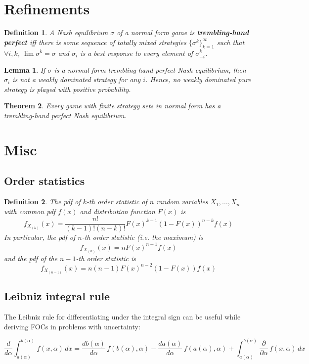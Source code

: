 \documentclass[letter, 10pt]{article}
\newtheorem{definition}{Definition}[section]
\newtheorem{theorem}{Theorem}[section]
\newtheorem{lemma}[theorem]{Lemma}
\begin{document}
\begin{spacing}{1.1}
\section{Refinements}

\begin{definition}
  A Nash equilibrium $\sigma$ of a normal form game is
  \textbf{trembling-hand perfect} iff there is some sequence of totally
  mixed strategies $\{\sigma^k\}_{k=1}^\infty$ such that $\forall i,k$,
  $\lim \sigma^k = \sigma$ and $\sigma_i$ is a best response to every
  element of $\sigma_{-i}^k$.
\end{definition}

\begin{lemma}
  If $\sigma$ is a normal form trembling-hand perfect Nash equilibrium, then
  $\sigma_i$ is not a weakly dominated strategy for any $i$. Hence, no weakly
  dominated pure strategy is played with positive probability.
\end{lemma}

\begin{theorem}
  Every game with finite strategy sets in normal form has a trembling-hand
  perfect Nash equilibrium.
\end{theorem}

\section{Misc}

\subsection{Order statistics}

\begin{definition}
  The pdf of $k$-th order statistic of $n$ random variables $X_1, \ldots, X_n$
  with common pdf $f(x)$ and distribution function $F(x)$ is \[f_{X_{(k)}}(x) =
  \frac{n!}{(k-1)!(n-k)!}F(x)^{k-1}\left(1-F(x)\right)^{n-k} f(x)\] In
  particular, the pdf of $n$-th order statistic (i.e. the maximum)
  is \[f_{X_{(n)}}(x) = n F(x)^{n-1} f(x)\] and the pdf of the $n-1$-th order
  statistic is \[f_{X_{(n-1)}}(x) = n(n-1) F(x)^{n-2} \left(1-F(x)\right) f(x)\]
\end{definition}

\subsection{Leibniz integral rule}

The Leibniz rule for differentiating under the integral sign can be useful while
deriving FOCs in problems with uncertainty:

\[\frac{d}{d\alpha}\int_{a(\alpha)}^{b(\alpha)} f(x,\alpha)\,dx = \frac{d b(\alpha)}{d \alpha}\,f(b(\alpha),\alpha)-\frac{d a(\alpha)}{d \alpha}\,f(a(\alpha),\alpha)+ \int_{a(\alpha)}^{b(\alpha)}\frac{\partial}{\partial \alpha}\,f(x,\alpha)\,dx\]

\end{spacing}
\end{document}
